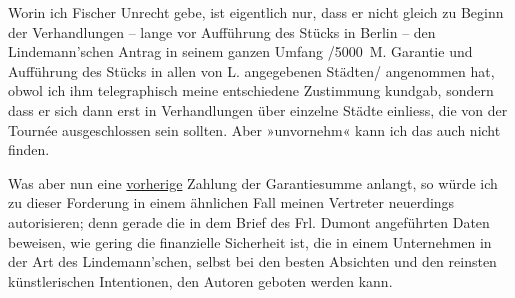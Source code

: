 \pstart
           Worin ich Fischer Unrecht gebe, ist eigentlich
               nur, dass er nicht gleich zu Beginn der Verhandlungen – lange vor Aufführung des Stücks in Berlin – den Lindemann’schen Antrag in seinem ganzen Umfang /5000 M. Garantie und Aufführung
               des Stücks in allen von L. angegebenen Städten/ angenommen hat, obwol
               ich ihm telegraphisch meine entschiedene Zustimmung kundgab, sondern dass er sich
               dann erst in Verhandlungen über einzelne Städte einliess, die von der Tournée
               ausgeschlossen sein sollte\introOben{}n\introOben{}. Aber \introOben{}»\introOben{}unvornehm\introOben{}«\introOben{} kann ich das auch nicht finden.\pend
           
\pstart
           {\pb}Was aber nun eine \uline{vorherige} Zahlung der Garantiesumme anlangt, so würde ich zu dieser
               Forderung in einem ähnlichen Fall meinen Vertreter neuerdings autorisieren; denn
               gerade die in dem Brief des Frl. Dumont
               angeführten Daten beweisen, wie gering die finanzielle Sicherheit ist, die in einem
               Unternehmen in der Art des Lindemann’schen,
               selbst bei den besten Absichten und den reinsten künstlerischen Intentionen, den
               Autoren geboten werden kann.\pend
           
